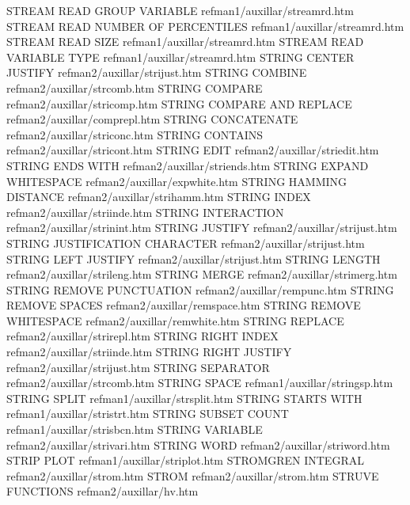 STREAM READ GROUP VARIABLE              refman1/auxillar/streamrd.htm
STREAM READ NUMBER OF PERCENTILES       refman1/auxillar/streamrd.htm
STREAM READ SIZE                        refman1/auxillar/streamrd.htm
STREAM READ VARIABLE TYPE               refman1/auxillar/streamrd.htm
STRING CENTER JUSTIFY                   refman2/auxillar/strijust.htm
STRING COMBINE                          refman2/auxillar/strcomb.htm
STRING COMPARE                          refman2/auxillar/stricomp.htm
STRING COMPARE AND REPLACE              refman2/auxillar/comprepl.htm
STRING CONCATENATE                      refman2/auxillar/striconc.htm
STRING CONTAINS                         refman2/auxillar/stricont.htm
STRING EDIT                             refman2/auxillar/striedit.htm
STRING ENDS WITH                        refman2/auxillar/striends.htm
STRING EXPAND WHITESPACE                refman2/auxillar/expwhite.htm
STRING HAMMING DISTANCE                 refman2/auxillar/strihamm.htm
STRING INDEX                            refman2/auxillar/striinde.htm
STRING INTERACTION                      refman2/auxillar/strinint.htm
STRING JUSTIFY                          refman2/auxillar/strijust.htm
STRING JUSTIFICATION CHARACTER          refman2/auxillar/strijust.htm
STRING LEFT JUSTIFY                     refman2/auxillar/strijust.htm
STRING LENGTH                           refman2/auxillar/strileng.htm
STRING MERGE                            refman2/auxillar/strimerg.htm
STRING REMOVE PUNCTUATION               refman2/auxillar/rempunc.htm
STRING REMOVE SPACES                    refman2/auxillar/remspace.htm
STRING REMOVE WHITESPACE                refman2/auxillar/remwhite.htm
STRING REPLACE                          refman2/auxillar/strirepl.htm
STRING RIGHT INDEX                      refman2/auxillar/striinde.htm
STRING RIGHT JUSTIFY                    refman2/auxillar/strijust.htm
STRING SEPARATOR                        refman2/auxillar/strcomb.htm
STRING SPACE                            refman1/auxillar/stringsp.htm
STRING SPLIT                            refman1/auxillar/strsplit.htm
STRING STARTS WITH                      refman1/auxillar/stristrt.htm
STRING SUBSET COUNT                     refman1/auxillar/strisbcn.htm
STRING VARIABLE                         refman2/auxillar/strivari.htm
STRING WORD                             refman2/auxillar/striword.htm
STRIP PLOT                              refman1/auxillar/striplot.htm
STROMGREN INTEGRAL                      refman2/auxillar/strom.htm
STROM                                   refman2/auxillar/strom.htm
STRUVE FUNCTIONS                        refman2/auxillar/hv.htm
